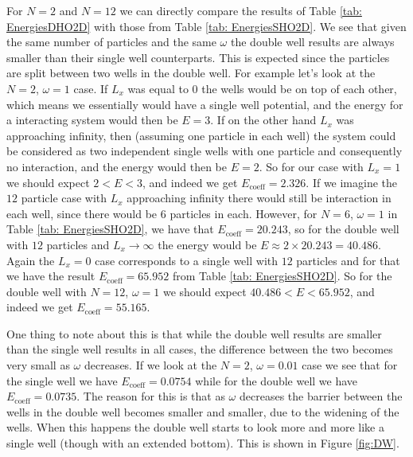 \documentclass[../main.tex]{subfiles}
\begin{document}
For $N=2$ and $N=12$ we can directly compare the results of Table \ref{tab: EnergiesDHO2D} with those from Table \ref{tab: EnergiesSHO2D}. We see that given the same number of particles and the same $\omega$ the double well results are always smaller than their single well counterparts. This is expected since the particles are split between two wells in the double well. For example let's look at the $N=2$, $\omega = 1$ case. If $L_x$ was equal to $0$ the wells would be on top of each other, which means we essentially would have a single well potential, and the energy for a interacting system would then be $E=3$. If on the other hand $L_x$ was approaching infinity, then (assuming one particle in each well) the system could be considered as two independent single wells with one particle and consequently no interaction, and the energy would then be $E=2$. So for our case with $L_x=1$ we should expect $2<E<3$, and indeed we get $E_\textrm{coeff}=2.326$. If we imagine the $12$ particle case with $L_x$ approaching infinity there would still be interaction in each well, since there would be $6$ particles in each. However, for $N=6$, $\omega=1$ in Table \ref{tab: EnergiesSHO2D}, we have that $E_\textrm{coeff}=20.243$, so for the double well with $12$ particles and $L_x \rightarrow \infty$ the energy would be $E \approx 2\times 20.243 = 40.486$. Again the $L_x=0$ case corresponds to a single well with $12$ particles and for that we have the result $E_\textrm{coeff}=65.952$ from Table \ref{tab: EnergiesSHO2D}. So for the double well with $N=12$, $\omega=1$ we should expect $40.486<E<65.952$, and indeed we get $E_\textrm{coeff}=55.165$.

One thing to note about this is that while the double well results are smaller than the single well results in all cases, the difference between the two becomes very small as $\omega$ decreases. If we look at the $N=2$, $\omega=0.01$ case we see that for the single well we have $E_\textrm{coeff}=0.0754$ while for the double well we have $E_\textrm{coeff}=0.0735$. The reason for this is that as $\omega$ decreases the barrier between the wells in the double well becomes smaller and smaller, due to the widening of the wells. When this happens the double well starts to look more and more like a single well (though with an extended bottom). This is shown in Figure \ref{fig:DW}.
\end{document}

